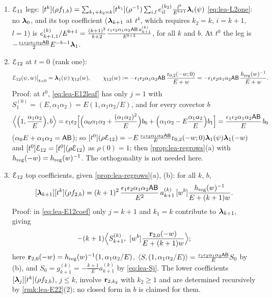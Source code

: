 \begin{rmk}
\label{rmk:lea-legs}
\begin{enumerate}
\item[(a)] $\mathcal{E}_{11}$ legs: $[t^k](\rho f_{1,b}) = \sum_{k_1+k_2 = k}[t^{k_1}](\rho^{-1})\sum_{i,l}e_{il}^{(k_2)}\frac{l^b}{E^{b+1}}\boldsymbol{\lambda}_i(\psi)$ \eqref{eq:lea-L2one}: no $\boldsymbol{\lambda}_0$, and its top coefficient ($\boldsymbol{\lambda}_{k+1}$ at $t^k$, which requires $k_2 = k$, $i = k+1$, $l = 1$) is $e_{k+1,1}^{(k)}/E^{b+1} = \frac{(k+1)^2}{k+2}\frac{\epsilon_1\epsilon_2\alpha_1\alpha_2\mathsf{A}\mathsf{B}\,a_{k+1}^{(k)}}{E^{b+3}}$, for all $k$ and $b$. At $t^0$ the leg is $-\frac{\epsilon_1\epsilon_2\alpha_1\alpha_2\mathsf{A}\mathsf{B}}{2}E^{-b-1}\boldsymbol{\lambda}_1$.
\item[(b)] $\mathcal{E}_{12}$ at $t = 0$ (rank one):
\[
\mathcal{E}_{12}(\psi,w)\big|_{t=0} = \boldsymbol{\lambda}_1(\psi)\,\chi_{12}(w),\qquad \chi_{12}(w) := -\epsilon_1\epsilon_2\alpha_1\alpha_2\mathsf{A}\mathsf{B}\,\frac{\mathrm{r}_{0,2}(-w;0)}{E+w} = -\epsilon_1\epsilon_2\alpha_1\alpha_2\mathsf{A}\mathsf{B}\,\frac{h_{\mathrm{reg}}(w)^{-1}}{E+w}.
\]
Proof: at $t^0$, \eqref{eq:lea-E12leaf} has only $j = 1$ with $S_1^{(0)} = (E,\alpha_1\alpha_2) = E(1,\alpha_1\alpha_2/E)$, and for every covector $b$
\[
\Bigl\langle\Bigl(1,\frac{\alpha_1\alpha_2}{E}\Bigr),b\Bigr\rangle = \epsilon_1\epsilon_2\Bigl[\Bigl(\alpha_0\alpha_1\alpha_2 + \frac{(\alpha_1\alpha_2)^2}{E}\Bigr)b_0 + \Bigl(\alpha_1\alpha_2 - E\frac{\alpha_1\alpha_2}{E}\Bigr)b_1\Bigr] = \frac{\epsilon_1\epsilon_2\alpha_1\alpha_2\mathsf{A}\mathsf{B}}{E}\,b_0
\]
($\alpha_0E+\alpha_1\alpha_2 = \mathsf{A}\mathsf{B}$); so $[t^0](\rho\mathcal{E}_{12}) = -E\,\frac{\epsilon_1\epsilon_2\alpha_1\alpha_2\mathsf{A}\mathsf{B}}{E}\mathrm{r}_{0,2}(-w;0)\boldsymbol{\lambda}_1(\psi)\boldsymbol{\lambda}_1(-w)$ and $[t^0]\mathcal{E}_{12} = [t^0](\rho\mathcal{E}_{12})$ as $\rho(0) = 1$; then \cref{prop:lea-regrows}(a) with $h_{\mathrm{reg}}(-w) = h_{\mathrm{reg}}(w)^{-1}$. The orthogonality is not needed here.
\item[(c)] $\mathcal{E}_{12}$ top coefficients, given \cref{prop:lea-regrows}(a), (b): for all $k$, $b$,
\[
[\boldsymbol{\lambda}_{k+1}][t^k](\rho f_{2,b}) = (k+1)^2\,\frac{\epsilon_1\epsilon_2\alpha_1\alpha_2\mathsf{A}\mathsf{B}}{E^2}\,a_{k+1}^{(k)}\,[w^b]\frac{h_{\mathrm{reg}}(w)^{-1}}{E+(k+1)w}.
\]
Proof: in \eqref{eq:lea-E12coef} only $j = k+1$ and $k_1 = k$ contribute to $\boldsymbol{\lambda}_{k+1}$, giving
\[
-(k+1)\Bigl\langle S_{k+1}^{(k)},\ \coef{w^b}\frac{\vv_{2,0}(-w)}{E+(k+1)w}\Bigr\rangle ;
\]
here $\mathbf{r}_{2,0}(-w) = h_{\mathrm{reg}}(w)^{-1}(1,\alpha_1\alpha_2/E)$, $\langle S,(1,\alpha_1\alpha_2/E)\rangle = \frac{\epsilon_1\epsilon_2\alpha_1\alpha_2\mathsf{A}\mathsf{B}}{E}S_0$ by (b), and $S_0 = g_{k+1}^{(k)} = -\frac{k+1}{E}a_{k+1}^{(k)}$ by \eqref{eq:lea-Sj}. The lower coefficients $[\boldsymbol{\lambda}_j][t^k](\rho f_{2,b})$, $j\leq k$, involve $\mathbf{r}_{2,k_2}$ with $k_2\geq 1$ and are determined recursively by \cref{rmk:lea-E22}(2); no closed form in $b$ is claimed for them.
\end{enumerate}
\end{rmk}

